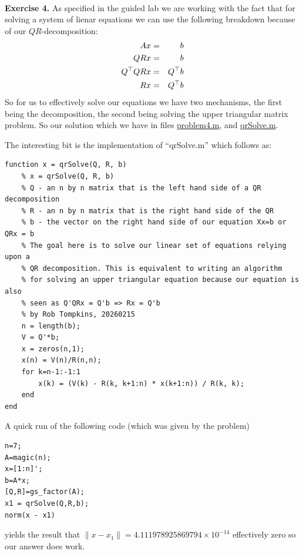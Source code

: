 \documentclass[12pt]{amsart}
\begin{document}
\begin{onehalfspace}
        \qquad\\
        \textbf{Exercise 4.} As specified in the guided lab we are working with the fact that for solving a system
        of lienar equations we can use the following breakdown because of our $QR$-decomposition:
        \begin{eqnarray*}
            \centering
            Ax & = & b \\
            QRx & = & b\\
            Q^{\top}QRx & = & Q^{\top}b \\
            Rx  & = & Q^{\top}b
        \end{eqnarray*}
        So for us to effectively solve our equations we have two mechanisms, the first being the decomposition,
        the second being solving the upper triangular matrix problem. So our solution which we have in files
        \href{https://github.com/chtompki/MathSpring2026/blob/main/NumericalAnalysis/GuidedLab2/problem4.m}{problem4.m}, and
        \href{https://github.com/chtompki/MathSpring2026/blob/main/NumericalAnalysis/GuidedLab2/qrSolve.m}{qrSolve.m}.

        The interesting bit is the implementation of ``qrSolve.m'' which follows as:
        \begin{tiny}
        \begin{verbatim}
function x = qrSolve(Q, R, b)
    % x = qrSolve(Q, R, b)
    % Q - an n by n matrix that is the left hand side of a QR decomposition
    % R - an n by n matrix that is the right hand side of the QR
    % b - the vector on the right hand side of our equation Xx=b or QRx = b
    % The goal here is to solve our linear set of equations relying upon a
    % QR decomposition. This is equivalent to writing an algorithm
    % for solving an upper triangular equation because our equation is also
    % seen as Q'QRx = Q'b => Rx = Q'b
    % by Rob Tompkins, 20260215
    n = length(b);
    V = Q'*b;
    x = zeros(n,1);
    x(n) = V(n)/R(n,n);
    for k=n-1:-1:1
        x(k) = (V(k) - R(k, k+1:n) * x(k+1:n)) / R(k, k);
    end
end
        \end{verbatim}
        \end{tiny}

        A quick run of the following code (which was given by the problem)
        \begin{tiny}
        \begin{verbatim}
n=7;
A=magic(n);
x=[1:n]';
b=A*x;
[Q,R]=gs_factor(A);
x1 = qrSolve(Q,R,b);
norm(x - x1)
        \end{verbatim}
        \end{tiny}
        yields the result that $\lVert x - x_1 \lVert = 4.111978925869794\times 10^{-14}$ effectively zero so our answer
        does work.


\end{onehalfspace}
\end{document}
